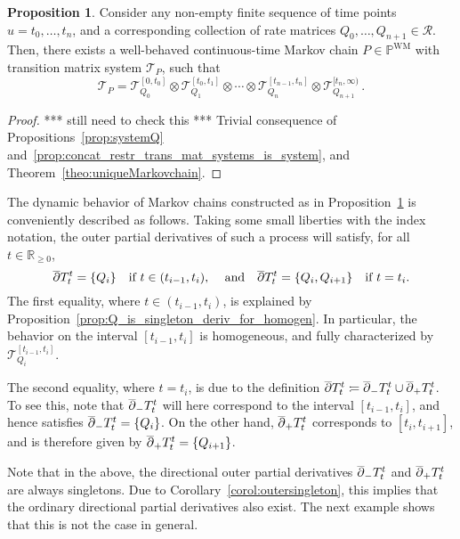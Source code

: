 \documentclass[10pt,a4paper]{paper}
\theoremstyle{definition}
\newtheorem{proposition}[theorem]{Proposition}
\newcommand{\reals}{\mathbb{R}}
\newcommand{\realsnonneg}{\reals_{\geq 0}}
\newcommand{\processes}{\mathbb{P}}
\newcommand{\wmprocesses}{\processes^{\mathrm{WM}}}
\newcommand{\coloneqq}{:\!=}
\begin{document}
\begin{proposition}\label{prop:finite_different_rate_matrix_has_process}
Consider any non-empty finite sequence of time points $u=t_0,\ldots,t_n$, and a corresponding collection of rate matrices $Q_0,\ldots,Q_{n+1}\in\mathcal{R}$. Then, there exists a well-behaved continuous-time Markov chain $P\in\wmprocesses$ with transition matrix system $\mathcal{T}_P$, such that
\begin{equation*}
\mathcal{T}_P = \mathcal{T}_{Q_0}^{[0,t_0]}\otimes \mathcal{T}_{Q_1}^{[t_0,t_1]} \otimes \cdots \otimes \mathcal{T}_{Q_n}^{[t_{n-1},t_n]} \otimes \mathcal{T}_{Q_{n+1}}^{[t_n,\infty)}\,.
\end{equation*}
\end{proposition}
\begin{proof}
*** still need to check this *** Trivial consequence of Propositions~\ref{prop:systemQ} and~\ref{prop:concat_restr_trans_mat_systems_is_system}, and Theorem~\ref{theo:uniqueMarkovchain}.
\end{proof}

The dynamic behavior of Markov chains constructed as in Proposition~\ref{prop:finite_different_rate_matrix_has_process} is conveniently described as follows. Taking some small liberties with the index notation, the outer partial derivatives of such a process will satisfy, for all $t\in\realsnonneg$,
\begin{equation*}
\smash{\overline{\partial}} T_t^t = \{Q_i\}\quad\text{if $t\in(t_{i-1},t_i)$,~~~~and}\quad \smash{\overline{\partial}} T_t^t = \{Q_i,Q_{i+1}\}\quad\text{if $t=t_i$.}
\end{equation*}
The first equality, where $t\in(t_{i-1},t_i)$, is explained by Proposition~\ref{prop:Q_is_singleton_deriv_for_homogen}. In particular, the behavior on the interval $[t_{i-1},t_i]$ is homogeneous, and fully characterized by $\mathcal{T}_{Q_i}^{[t_{i-1},t_i]}$.

The second equality, where $t=t_i$, is due to the definition $\smash{\overline{\partial}}T_t^t\coloneqq \smash{\overline{\partial}}_-T_t^t\cup \smash{\overline{\partial}}_+T_t^t$. To see this, note that $\smash{\overline{\partial}}_-T_t^t$ will here correspond to the interval $[t_{i-1}, t_i]$, and hence satisfies $\smash{\overline{\partial}}_-T_t^t=\{Q_i\}$. On the other hand, $\smash{\overline{\partial}}_+T_t^t$ corresponds to $[t_i,t_{i+1}]$, and is therefore given by $\smash{\overline{\partial}}_+T_t^t=\{Q_{i+1}\}$.

Note that in the above, the directional outer partial derivatives $\smash{\overline{\partial}}_-T_t^t$ and $\smash{\overline{\partial}}_+T_t^t$ are always singletons. Due to Corollary~\ref{corol:outersingleton}, this implies that the ordinary directional partial derivatives also exist. The next example shows that this is not the case in general.
\end{document}
